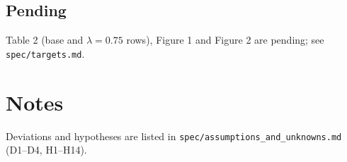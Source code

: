\documentclass{article}
\begin{document}
\subsection{Pending}
Table 2 (base and $\lambda=0.75$ rows), Figure 1 and Figure 2 are pending; see \texttt{spec/targets.md}.

\section{Notes}
Deviations and hypotheses are listed in \texttt{spec/assumptions\_and\_unknowns.md} (D1--D4, H1--H14).
\end{document}
